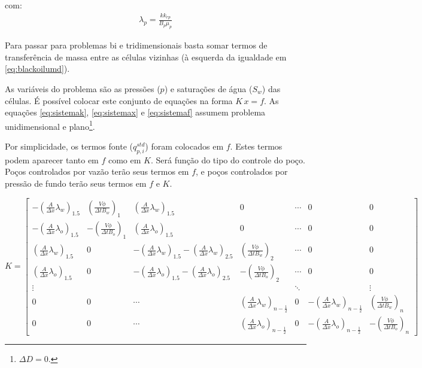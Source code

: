 \documentclass[final,5p]{elsarticle}
\numberwithin{equation}{section}
\begin{document}
        \noindent com:
        \begin{align}
            \lambda_p = \frac{k k_{rp}}{B_p \mu_p} \nonumber
        \end{align}

        Para passar para problemas bi e tridimensionais basta somar termos de transferência de massa entre as células vizinhas (à esquerda da igualdade em \ref{eq:blackoilumd}).

        As variáveis do problema são as pressões ($p$) e saturações de água ($S_w$) das células. É possível colocar este conjunto de equações na forma $K\,x=f$. As equações \ref{eq:sistemak}, \ref{eq:sistemax} e \ref{eq:sistemaf} assumem problema unidimensional e plano\footnote{$\Delta D = 0$.}.

        Por simplicidade, os termos fonte ($q^{std}_{p,i}$) foram colocados em $f$. Estes termos podem aparecer tanto em $f$ como em $K$. Será função do tipo do controle do poço. Poços controlados por vazão terão seus termos em $f$, e poços controlados por pressão de fundo terão seus termos em $f$ e $K$.

        \begin{figure*}
        \begin{equation}
            K =
            \begin{bmatrix}
                    -\left( \frac{A}{\Delta x} \lambda_w \right)_{1.5} &  \left(\frac{V \phi}{\Delta t B_w}\right)_1 & \left( \frac{A}{\Delta x} \lambda_w \right)_{1.5} & 0 & \cdots & 0 & 0 \\
                    -\left( \frac{A}{\Delta x} \lambda_o \right)_{1.5} & -\left(\frac{V \phi}{\Delta t B_o}\right)_1 & \left( \frac{A}{\Delta x} \lambda_o \right)_{1.5} & 0 & \cdots & 0 & 0 \\

                    \left( \frac{A}{\Delta x} \lambda_w \right)_{1.5} & 0 & -\left( \frac{A}{\Delta x} \lambda_w \right)_{1.5}-\left( \frac{A}{\Delta x} \lambda_w \right)_{2.5} &  \left(\frac{V \phi}{\Delta t B_w}\right)_2 & \cdots & 0 & 0 \\
                    \left( \frac{A}{\Delta x} \lambda_o \right)_{1.5} & 0 & -\left( \frac{A}{\Delta x} \lambda_o \right)_{1.5}-\left( \frac{A}{\Delta x} \lambda_o \right)_{2.5} & -\left(\frac{V \phi}{\Delta t B_o}\right)_2 & \cdots & 0  & 0 \\

                    \vdots     &     &      &  & \ddots &  & \vdots \\
                    0 & 0 & \cdots & \left( \frac{A}{\Delta x} \lambda_w \right)_{n-\frac{1}{2}} &  0 & -\left( \frac{A}{\Delta x} \lambda_w \right)_{n-\frac{1}{2}} &  \left(\frac{V \phi}{\Delta t B_w}\right)_n \\
                    0 & 0 & \cdots & \left( \frac{A}{\Delta x} \lambda_o \right)_{n-\frac{1}{2}} &  0 & -\left( \frac{A}{\Delta x} \lambda_o \right)_{n-\frac{1}{2}} & -\left(\frac{V \phi}{\Delta t B_o}\right)_n
            \end{bmatrix}
            \label{eq:sistemak}
        \end{equation}
        \end{figure*}
\end{document}
